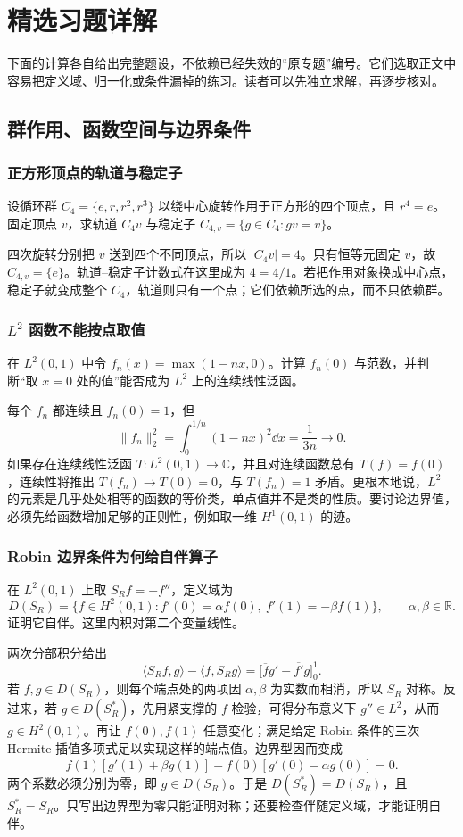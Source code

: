 \chapter{精选习题详解}

下面的计算各自给出完整题设，不依赖已经失效的“原专题”编号。它们选取正文中容易把定义域、归一化或条件漏掉的练习。读者可以先独立求解，再逐步核对。

\section{群作用、函数空间与边界条件}

\subsection*{正方形顶点的轨道与稳定子}
设循环群 \(C_4=\{e,r,r^2,r^3\}\) 以绕中心旋转作用于正方形的四个顶点，且 \(r^4=e\)。固定顶点 \(v\)，求轨道 \(C_4v\) 与稳定子 \(C_{4,v}=\{g\in C_4:gv=v\}\)。

四次旋转分别把 \(v\) 送到四个不同顶点，所以 \(|C_4v|=4\)。只有恒等元固定 \(v\)，故 \(C_{4,v}=\{e\}\)。轨道--稳定子计数式在这里成为 \(4=4/1\)。若把作用对象换成中心点，稳定子就变成整个 \(C_4\)，轨道则只有一个点；它们依赖所选的点，而不只依赖群。

\subsection*{\(L^2\) 函数不能按点取值}
在 \(L^2(0,1)\) 中令 \(f_n(x)=\max(1-nx,0)\)。计算 \(f_n(0)\) 与范数，并判断“取 \(x=0\) 处的值”能否成为 \(L^2\) 上的连续线性泛函。

每个 \(f_n\) 都连续且 \(f_n(0)=1\)，但
\[
\|f_n\|_2^2=\int_0^{1/n}(1-nx)^2\dd x
=\frac1{3n}\longrightarrow0.
\]
如果存在连续线性泛函 \(T:L^2(0,1)\to\mathbb C\)，并且对连续函数总有 \(T(f)=f(0)\)，连续性将推出 \(T(f_n)\to T(0)=0\)，与 \(T(f_n)=1\) 矛盾。更根本地说，\(L^2\) 的元素是几乎处处相等的函数的等价类，单点值并不是类的性质。要讨论边界值，必须先给函数增加足够的正则性，例如取一维 \(H^1(0,1)\) 的迹。

\subsection*{Robin 边界条件为何给自伴算子}
在 \(L^2(0,1)\) 上取 \(S_Rf=-f''\)，定义域为
\[
D(S_R)=\{f\in H^2(0,1):f'(0)=\alpha f(0),\ f'(1)=-\beta f(1)\},
\qquad \alpha,\beta\in\mathbb R.
\]
证明它自伴。这里内积对第二个变量线性。

两次分部积分给出
\[
\langle S_Rf,g\rangle-\langle f,S_Rg\rangle
=\bigl[\overline{f}g'-\overline{f'}g\bigr]_0^1.
\]
若 \(f,g\in D(S_R)\)，则每个端点处的两项因 \(\alpha,\beta\) 为实数而相消，所以 \(S_R\) 对称。反过来，若 \(g\in D(S_R^*)\)，先用紧支撑的 \(f\) 检验，可得分布意义下 \(g''\in L^2\)，从而 \(g\in H^2(0,1)\)。再让 \(f(0),f(1)\) 任意变化；满足给定 Robin 条件的三次 Hermite 插值多项式足以实现这样的端点值。边界型因而变成
\[
\overline{f(1)}[g'(1)+\beta g(1)]
-\overline{f(0)}[g'(0)-\alpha g(0)]=0.
\]
两个系数必须分别为零，即 \(g\in D(S_R)\)。于是 \(D(S_R^*)=D(S_R)\)，且 \(S_R^*=S_R\)。只写出边界型为零只能证明对称；还要检查伴随定义域，才能证明自伴。

